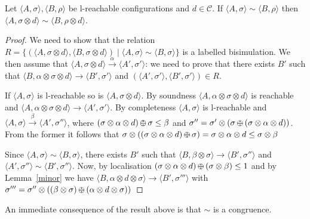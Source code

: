 \documentclass{llncs}
\def\odiv{\, {\ominus\hspace{-7.7pt} \div} \,}
\begin{document}
\begin{proposition}
Let $\langle A,\sigma \rangle, \langle B,\rho \rangle$ be l-reachable configurations and $d \in \mathcal{C}$.
If $\langle A,\sigma \rangle \sim \langle B,\rho \rangle$
then $\langle A,\sigma \otimes d\rangle \sim \langle B,\rho \otimes d \rangle$.
\end{proposition}
\begin{proof}
We need to show that the relation 
$R = \{ (\langle A,\sigma \otimes d \rangle, \langle B,\sigma \otimes d \rangle) \mid \langle A,\sigma \rangle \sim \langle B,\sigma \rangle\}$
is a labelled bisimulation. We then assume that 
$\langle A, \sigma \otimes d \rangle  \xrightarrow{\alpha} \langle A', \sigma' \rangle$: 
we need to prove that there exists $B'$ such that
$\langle B,\alpha \otimes  \sigma \otimes d \rangle  \xrightarrow{} \langle B', \sigma' \rangle$ 
  and $(\langle A', \sigma' \rangle, \langle B', \sigma' \rangle) \in R$.

If  $\langle A,\sigma \rangle$ is l-reachable so is $\langle A,\sigma \otimes d \rangle$.
%
By soundness $\langle A, \alpha \otimes  \sigma \otimes d \rangle$ is reachable and
$\langle A, \alpha \otimes  \sigma \otimes d \rangle  \xrightarrow{}\langle A', \sigma' \rangle$.
  By completeness $\langle A,  \sigma \rangle$ is l-reachable and
  $\langle A,  \sigma \rangle  \xrightarrow{\beta}\langle A', \sigma'' \rangle$,
  where $(\sigma \otimes \alpha \otimes d) \odiv \sigma\leq \beta$ and 
  $\sigma'' = \sigma' \otimes (\sigma \odiv (\sigma \otimes \alpha \otimes d))$.
  From the former it follows that 
  $\sigma \otimes ((\sigma \otimes \alpha \otimes d) \odiv \sigma) = \sigma \otimes \alpha \otimes d\leq \sigma \otimes \beta$

  Since $\langle A,\sigma \rangle \sim \langle B,\sigma \rangle$, 
  there exists $B'$ such that 
  $\langle B, \beta \otimes \sigma \rangle \xrightarrow{} \langle B', \sigma'' \rangle$
  and $\langle A', \sigma'' \rangle \sim \langle B', \sigma'' \rangle$.
  Now, by localisation $(\sigma \otimes \alpha \otimes d) \odiv (\sigma \otimes \beta) \leq 1$ 
  and by Lemma~\ref{minor}
  we have 
  $\langle B, \alpha \otimes d \otimes \sigma \rangle 
  \xrightarrow{} \langle B', \sigma''' \rangle$
  with 
  $\sigma''' = \sigma'' \otimes ((\beta \otimes \sigma) \odiv (\alpha \otimes d \otimes \sigma))$
\end{proof}

An immediate consequence of the result above is that $\sim$ is a congruence.
\end{document}
